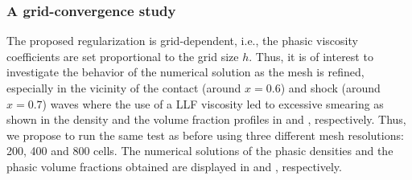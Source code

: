 \subsubsection{A grid-convergence study}\label{sec:grid-conv-study}
The proposed regularization is grid-dependent, i.e., the phasic viscosity coefficients are set proportional to the grid size $h$. Thus, it is of interest to investigate the behavior of the numerical solution as the mesh is refined, especially in the
vicinity of the contact (around $x=0.6$) and shock (around $x=0.7$) waves where the use of a LLF viscosity led to excessive smearing as shown in the density and the volume fraction profiles in  and 
, respectively. Thus, we propose to run the same test as before using three different mesh resolutions:
 200, 400 and 800 cells. The numerical solutions of the phasic densities and the phasic volume fractions obtained are displayed
in  and , respectively.
%
